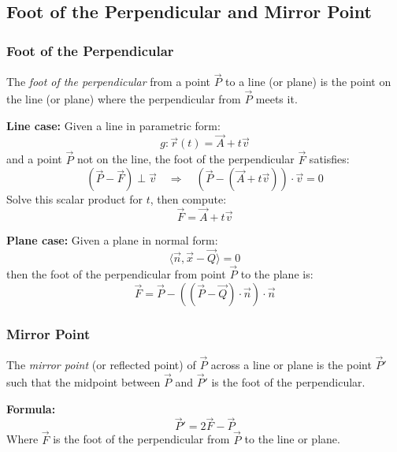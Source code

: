 \subsection{Foot of the Perpendicular and Mirror Point}

\subsubsection*{Foot of the Perpendicular}

The \emph{foot of the perpendicular} from a point \(\vec{P}\) to a line (or plane) is the point on the line (or plane) where the perpendicular from \(\vec{P}\) meets it.

\textbf{Line case:}
Given a line in parametric form:
\[
	g: \vec{r}(t) = \vec{A} + t\vec{v}
\]
and a point \(\vec{P}\) not on the line, the foot of the perpendicular \(\vec{F}\) satisfies:
\[
	(\vec{P} - \vec{F}) \perp \vec{v} \quad \Rightarrow \quad (\vec{P} - (\vec{A} + t\vec{v})) \cdot \vec{v} = 0
\]
Solve this scalar product for \(t\), then compute:
\[
	\vec{F} = \vec{A} + t\vec{v}
\]

\textbf{Plane case:}
Given a plane in normal form:
\[
	\langle \vec{n}, \vec{x} - \vec{Q} \rangle = 0
\]
then the foot of the perpendicular from point \(\vec{P}\) to the plane is:
\[
	\vec{F} = \vec{P} - ((\vec{P} - \vec{Q}) \cdot \vec{n}) \cdot \vec{n}
\]

\subsubsection*{Mirror Point}

The \emph{mirror point} (or reflected point) of \(\vec{P}\) across a line or plane is the point \(\vec{P}'\) such that the midpoint between \(\vec{P}\) and \(\vec{P}'\) is the foot of the perpendicular.

 \textbf{Formula:}
\[
	\vec{P}' = 2\vec{F} - \vec{P}
\]
Where \(\vec{F}\) is the foot of the perpendicular from \(\vec{P}\) to the line or plane.
